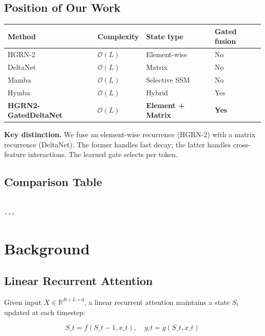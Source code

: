 \subsection{Position of Our Work}

\begin{table}[H]
\centering
\small
\begin{tabular}{llll}
\toprule
\textbf{Method} & \textbf{Complexity} & \textbf{State type} & \textbf{Gated fusion} \\
\midrule
HGRN-2 & $\mathcal{O}(L)$ & Element-wise & No \\
DeltaNet & $\mathcal{O}(L)$ & Matrix & No \\
Mamba & $\mathcal{O}(L)$ & Selective SSM & No \\
Hymba & $\mathcal{O}(L)$ & Hybrid & Yes \\
\textbf{HGRN2-GatedDeltaNet} & $\mathcal{O}(L)$ & \textbf{Element + Matrix} & \textbf{Yes} \\
\bottomrule
\end{tabular}
\end{table}

\textbf{Key distinction.} We fuse an element-wise recurrence (HGRN-2) with a 
matrix recurrence (DeltaNet). The former handles fast decay; the latter 
handles cross-feature interactions. The learned gate selects per token.



\subsection{Comparison Table}

\begin{lstlisting}

---
\end{lstlisting}

\section{Background}

\subsection{Linear Recurrent Attention}

Given input $X \in \mathbb{R}^{B \times L \times d}$, a linear recurrent 
attention maintains a state $S_t$ updated at each timestep:

\[
S\_t = f(S\_{t-1}, x\_t), \quad
y\_t = g(S\_t, x\_t)
\tag{3.1}
\]

